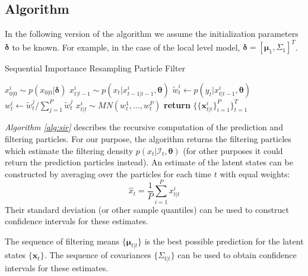 \documentclass[11pt, oneside]{scrreprt}   	%
\begin{document}
\subsection{Algorithm}
In the following version of the algorithm we assume the initialization parameters $\boldsymbol{\delta}$ to be known. For example, in the case of the local level model, $\boldsymbol{\delta} = [\boldsymbol{\mu}_1, \Sigma_1]^T$.\\

\begin{algorithm}[h!]
\caption{Sequential Importance Resampling Particle Filter}
\label{alg:sir}
\begin{algorithmic}[1]
      	\smallskip
		\State $x_{0 | 0 }^i \sim p(x_{0 | 0 } | \boldsymbol{\delta})$ 
	\EndFor
      	\smallskip
      			\State $x_{t | t-1}^i \sim p(x_t | x_{t-1 | t-1}^i, \boldsymbol{\theta})$ 
			\smallskip
      			\State $\tilde{w}_t^i \gets p(y_t | x_{t | t-1}^i, \boldsymbol{\theta})$ 
		\EndFor	
		\smallskip
			\State $w_t^i \gets \tilde{w}_t^j / \sum_{j=1}^P \tilde{w}_t^j$ 
		\EndFor	
		\smallskip
			\State $x_{t | t }^i \sim MN(w_t^1, \ldots, w_t^P)$ 
		\EndFor
      \EndFor
      \State \textbf{return} $\{\{\boldsymbol{x}_{t | t}^i\}_{i=1}^P\}_{t=1}^T$
    \EndProcedure
  \end{algorithmic}
\end{algorithm}
\textit{Algorithm \ref{alg:sir}} describes the recursive computation of the prediction and filtering particles.  
For our purpose, the algorithm returns the filtering particles which estimate the filtering density $p(x_t | \mathcal{I}_t, \boldsymbol{\theta})$ (for other purposes it could return the prediction particles instead). 
An estimate of the latent states can be constructed by averaging over the particles for each time $t$ with equal weights: 
$$
\hat{x}_t = \frac{1}{P}\sum_{i=1}^P x_{t | t}^i
$$
Their standard deviation (or other sample quantiles) can be used to construct confidence intervals for these estimates. 

The sequence of filtering means $\{\boldsymbol{\mu}_{t | t}\}$ is the best possible prediction for the latent states $\{\boldsymbol{x}_t\}$. 
The sequence of covariances $\{\Sigma_{t | t}\}$ can be used to obtain confidence intervals for these estimates. \\  
\end{document}
